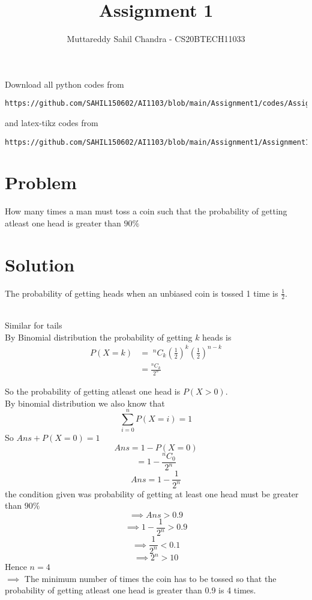 \documentclass[journal,12pt,twocolumn]{IEEEtran}
\begin{document}
\title{Assignment 1}
\author{Muttareddy Sahil Chandra - CS20BTECH11033}
\maketitle
\newpage
\bigskip
\renewcommand{\thefigure}{\theenumi}
\renewcommand{\thetable}{\theenumi}
Download all python codes from 
\begin{lstlisting}
https://github.com/SAHIL150602/AI1103/blob/main/Assignment1/codes/Assignment.py
\end{lstlisting}
%
and latex-tikz codes from 
%
\begin{lstlisting}
https://github.com/SAHIL150602/AI1103/blob/main/Assignment1/Assignment1.tex
\end{lstlisting}
\section{Problem}
How many times a man must toss a coin such that the probability of getting atleast one head is greater than $90\%$
\section{Solution} 
The probability of getting heads when an unbiased coin is tossed 1 time  is {\large$\frac{1}{2}$}.

  \\ Similar for tails
  \\By Binomial distribution the probability of getting $k$ heads is
  \begin{equation}
      \begin{split}
        P(X = k) & =\;  ^nC_k \left(\frac{1}{2}\right)^k \left(\frac{1}{2}\right)^{n-k}\\   & =\frac{^nC_k}{2^n}  
      \end{split}
  \end{equation}
     
  So the probability of getting atleast one head is $P(X>0) $.\\
  By binomial distribution we also know that 
  \[\sum_{i=0}^{n}P(X=i)=1\]
  So    \;\;\;\;\;\;\;\;\;\;\;\;\;    $Ans + P(X=0)=1$
  $$Ans = 1-P(X=0)$$
  $$= 1-\frac{^nC_0}{2^n}$$
  $$Ans =1- \frac{1}{2^n}$$
  the condition given was probability of getting at least one head must be greater than  $90\%$
  $$\implies  Ans>0.9$$
  $$\implies 1-\frac{1}{2^n}>0.9$$
  $$\implies\frac{1}{2^n}<0.1$$
  $$\implies 2^n>10$$
  Hence $n =4$\\
$\implies$ The minimum number of times the coin has to be tossed so that the probability  of getting atleast one head is greater than 0.9 is 4 times.    
\end{document}
